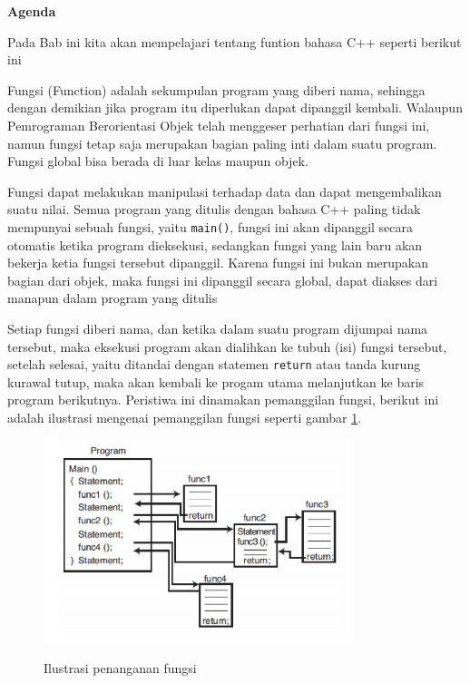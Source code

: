 \textbf{Agenda}

Pada Bab ini kita akan mempelajari tentang funtion bahasa C++ seperti berikut ini

\minitoc

Fungsi (Function) adalah sekumpulan program yang diberi nama, sehingga
dengan demikian jika program itu diperlukan dapat dipanggil kembali.
Walaupun Pemrograman Berorientasi Objek telah menggeser perhatian dari
fungsi ini, namun fungsi tetap saja merupakan bagian paling inti dalam
suatu program. Fungsi global bisa berada di luar kelas maupun objek.

Fungsi dapat melakukan manipulasi terhadap data dan dapat mengembalikan
suatu nilai. Semua program yang ditulis dengan bahasa C++ paling tidak
mempunyai sebuah fungsi, yaitu \texttt{main()}, fungsi ini akan
dipanggil secara otomatis ketika program dieksekusi, sedangkan fungsi
yang lain baru akan bekerja ketia fungsi tersebut dipanggil. Karena
fungsi ini bukan merupakan bagian dari objek, maka fungsi ini dipanggil
secara global, dapat diakses dari manapun dalam program yang ditulis

Setiap fungsi diberi nama, dan ketika dalam suatu program dijumpai nama
tersebut, maka eksekusi program akan dialihkan ke tubuh (isi) fungsi
tersebut, setelah selesai, yaitu ditandai dengan statemen
\texttt{return} atau tanda kurung kurawal tutup, maka akan kembali ke
progam utama melanjutkan ke baris program berikutnya. Peristiwa ini
dinamakan pemanggilan fungsi, berikut ini adalah ilustrasi mengenai
pemanggilan fungsi seperti gambar \ref{gambar4-1}.

\begin{figure}[htbp]
\centering
\includegraphics[width=0.8\textwidth]{../manuscript/images/capture4-1.PNG}
\label{gambar4-1}
\caption{Ilustrasi penanganan fungsi}
\end{figure}

